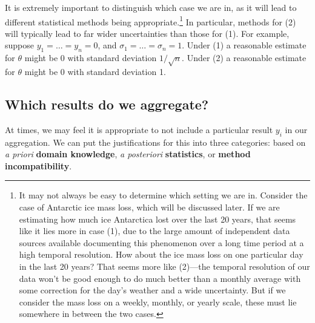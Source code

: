 \documentclass[letterpaper,12pt]{article}
\begin{document}
It is extremely important to distinguish which case we are in, as it will lead to different statistical methods being appropriate.\footnote{It may not always be easy to determine which setting we are in. Consider the case of Antarctic ice mass loss, which will be discussed later. If we are estimating how much ice Antarctica lost over the last 20 years, that seems like it lies more in case (1), due to the large amount of independent data sources available documenting this phenomenon over a long time period at a high temporal resolution. How about the ice mass loss on one particular day in the last 20 years? That seems more like (2)---the temporal resolution of our data won't be good enough to do much better than a monthly average with some correction for the day's weather and a wide uncertainty. But if we consider the mass loss on a weekly, monthly, or yearly scale, these must lie somewhere in between the two cases.} In particular, methods for (2) will typically lead to far wider uncertainties than those for (1). For example, suppose $y_1=\ldots=y_n=0$, and $\sigma_1=\ldots=\sigma_n=1$. Under (1) a reasonable estimate for $\theta$ might be $0$ with standard deviation $1/\sqrt{n}$. Under (2) a reasonable estimate for $\theta$ might be $0$ with standard deviation 1.

\subsection{Which results do we aggregate?}

At times, we may feel it is appropriate to not include a particular result $y_i$ in our aggregation. We can put the justifications for this into three categories: based on \textit{a priori} \textbf{domain knowledge}, \textit{a posteriori} \textbf{statistics}, or \textbf{method incompatibility}.
\end{document}
